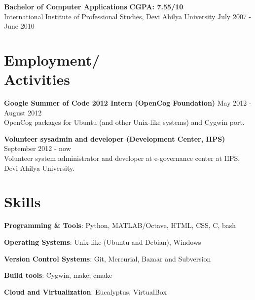 \documentclass[margin,line]{resume}
\begin{document}
\begin{resume}
	\begin{list2}
	\item \textbf{Bachelor of Computer Applications} \hspace{70mm} \textbf{CGPA: 7.55/10} \\ International Institute of Professional Studies, Devi Ahilya University \hspace{20mm} July 2007 - June 2010
	\end{list2}

    \section{\mysidestyle Employment/ \\ Activities}

    \begin{list2}
	\item \textbf{Google Summer of Code 2012 Intern (OpenCog Foundation)} \hspace{15mm} May 2012 - August 2012 \\ OpenCog packages for Ubuntu (and other Unix-like systems) and Cygwin port.
	\item \textbf{Volunteer sysadmin and developer (Development Center, IIPS)} \hspace{12mm} September 2012 - now \\ Volunteer system administrator and developer at e-governance center at IIPS, Devi Ahilya University.
	\end{list2}

    \section{\mysidestyle Skills} 

    \begin{list2}
	\item \textbf{Programming \& Tools}: \hspace{8mm} Python, MATLAB/Octave, HTML, CSS, C, bash
	\item \textbf{Operating Systems}: \hspace{13.8mm} Unix-like (Ubuntu and Debian), Windows
	\item \textbf{Version Control Systems}: \hspace{3.5mm} Git, Mercurial, Bazaar and Subversion
	\item \textbf{Build tools}: \hspace{28mm} Cygwin, make, cmake
	\item \textbf{Cloud and Virtualization}: \hspace{3mm} Eucalyptus, VirtualBox
	\end{list2}


\end{resume}
\end{document}
